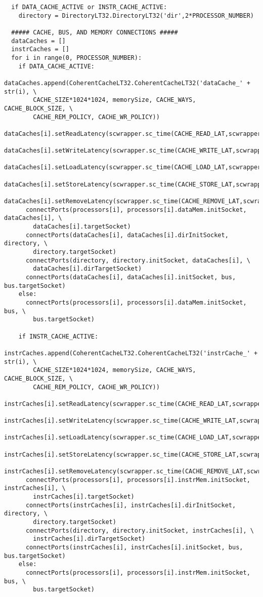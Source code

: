 \scriptsize
\begin{verbatim}
  if DATA_CACHE_ACTIVE or INSTR_CACHE_ACTIVE:
    directory = DirectoryLT32.DirectoryLT32('dir',2*PROCESSOR_NUMBER)

  ##### CACHE, BUS, AND MEMORY CONNECTIONS #####
  dataCaches = []
  instrCaches = []
  for i in range(0, PROCESSOR_NUMBER):
    if DATA_CACHE_ACTIVE:
      dataCaches.append(CoherentCacheLT32.CoherentCacheLT32('dataCache_' + str(i), \
        CACHE_SIZE*1024*1024, memorySize, CACHE_WAYS, CACHE_BLOCK_SIZE, \
        CACHE_REM_POLICY, CACHE_WR_POLICY))
      dataCaches[i].setReadLatency(scwrapper.sc_time(CACHE_READ_LAT,scwrapper.SC_NS))
      dataCaches[i].setWriteLatency(scwrapper.sc_time(CACHE_WRITE_LAT,scwrapper.SC_NS))
      dataCaches[i].setLoadLatency(scwrapper.sc_time(CACHE_LOAD_LAT,scwrapper.SC_NS))
      dataCaches[i].setStoreLatency(scwrapper.sc_time(CACHE_STORE_LAT,scwrapper.SC_NS))
      dataCaches[i].setRemoveLatency(scwrapper.sc_time(CACHE_REMOVE_LAT,scwrapper.SC_NS))
      connectPorts(processors[i], processors[i].dataMem.initSocket, dataCaches[i], \
        dataCaches[i].targetSocket)
      connectPorts(dataCaches[i], dataCaches[i].dirInitSocket, directory, \
        directory.targetSocket)
      connectPorts(directory, directory.initSocket, dataCaches[i], \
        dataCaches[i].dirTargetSocket)
      connectPorts(dataCaches[i], dataCaches[i].initSocket, bus, bus.targetSocket)
    else:
      connectPorts(processors[i], processors[i].dataMem.initSocket, bus, \
        bus.targetSocket)

    if INSTR_CACHE_ACTIVE:
      instrCaches.append(CoherentCacheLT32.CoherentCacheLT32('instrCache_' + str(i), \
        CACHE_SIZE*1024*1024, memorySize, CACHE_WAYS, CACHE_BLOCK_SIZE, \
        CACHE_REM_POLICY, CACHE_WR_POLICY))
      instrCaches[i].setReadLatency(scwrapper.sc_time(CACHE_READ_LAT,scwrapper.SC_NS))
      instrCaches[i].setWriteLatency(scwrapper.sc_time(CACHE_WRITE_LAT,scwrapper.SC_NS))
      instrCaches[i].setLoadLatency(scwrapper.sc_time(CACHE_LOAD_LAT,scwrapper.SC_NS))
      instrCaches[i].setStoreLatency(scwrapper.sc_time(CACHE_STORE_LAT,scwrapper.SC_NS))
      instrCaches[i].setRemoveLatency(scwrapper.sc_time(CACHE_REMOVE_LAT,scwrapper.SC_NS))
      connectPorts(processors[i], processors[i].instrMem.initSocket, instrCaches[i], \
        instrCaches[i].targetSocket)
      connectPorts(instrCaches[i], instrCaches[i].dirInitSocket, directory, \
        directory.targetSocket)
      connectPorts(directory, directory.initSocket, instrCaches[i], \
        instrCaches[i].dirTargetSocket)
      connectPorts(instrCaches[i], instrCaches[i].initSocket, bus, bus.targetSocket)
    else:
      connectPorts(processors[i], processors[i].instrMem.initSocket, bus, \
        bus.targetSocket)
\end{verbatim}
\normalsize

